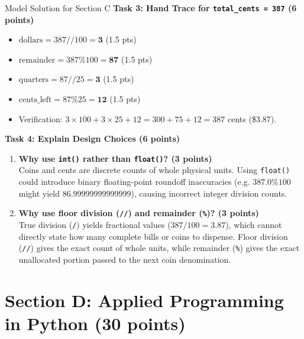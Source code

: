 \documentclass[11pt,a4paper]{article}
\begin{document}
\begin{solbox}{Model Solution for Section C}
\vspace{0.2cm}
\textbf{Task 3: Hand Trace for \texttt{total\_cents = 387} (6 points)}
\begin{itemize}[leftmargin=2em]
  \item $\text{dollars} = 387 // 100 = \mathbf{3}$ (1.5 pts)
  \item $\text{remainder} = 387 \% 100 = \mathbf{87}$ (1.5 pts)
  \item $\text{quarters} = 87 // 25 = \mathbf{3}$ (1.5 pts)
  \item $\text{cents\_left} = 87 \% 25 = \mathbf{12}$ (1.5 pts)
  \item Verification: $3 \times 100 + 3 \times 25 + 12 = 300 + 75 + 12 = 387$ cents (\$3.87).
\end{itemize}

\vspace{0.2cm}
\textbf{Task 4: Explain Design Choices (6 points)}
\begin{enumerate}[label=\alph*),leftmargin=2em]
  \item \textbf{Why use \texttt{int()} rather than \texttt{float()}? (3 points)} \\
  Coins and cents are discrete counts of whole physical units. Using \texttt{float()} could introduce binary floating-point roundoff inaccuracies (e.g. $387.0 \% 100$ might yield $86.99999999999999$), causing incorrect integer division counts.
  \item \textbf{Why use floor division (\texttt{//}) and remainder (\texttt{\%})? (3 points)} \\
  True division (\texttt{/}) yields fractional values ($387 / 100 = 3.87$), which cannot directly state how many complete bills or coins to dispense. Floor division (\texttt{//}) gives the exact count of whole units, while remainder (\texttt{\%}) gives the exact unallocated portion passed to the next coin denomination.
\end{enumerate}
\end{solbox}

\newpage

\section*{Section D: Applied Programming in Python (30 points)}
\end{document}
